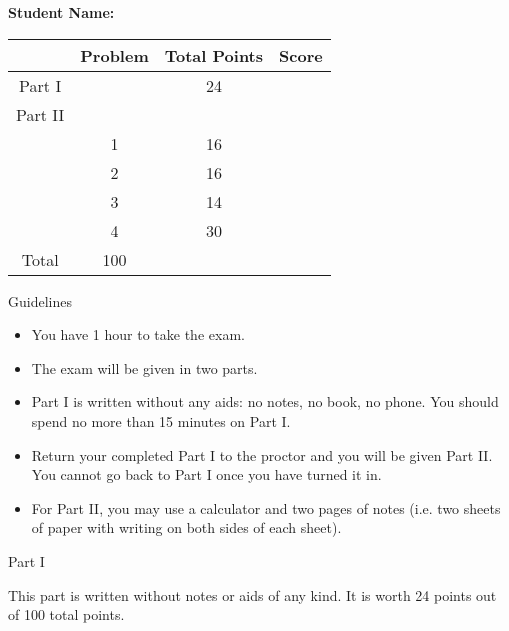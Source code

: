 \documentclass[11pt]{article}
\def\bc{\begin{center}}
\def\ec{\end{center}}
\begin{document}
\thispagestyle{fancy}

\vspace{1in}

\textbf{Student Name:}\hspace{2in}

\vspace{1in}

{
\renewcommand{\baselinestretch}{1.8}
\setlength{\tabcolsep}{.2in}
\normalsize
\begin{center}
\begin{tabular}{|c|c|c|c|}
\hline
&Problem&Total Points&\parbox{.8in}{\hfil Score\hfil}\\
\hline
Part I&&24&\\
\hline
Part II &&&\\
\hline
&1&16&\\
\hline
&2&16&\\
\hline
&3&14&\\
\hline
&4&30&\\
\hline
\hline
Total&100&&\\
\hline
\end{tabular}

\end{center}
}

\vspace{1in} 

Guidelines
\begin{itemize}
\item You have 1 hour to take the exam.
\item The exam will be given in two parts.
\item Part I is written without any aids: no notes, no book, no phone. You should spend no more than 15 minutes on Part I. 
\item Return your completed Part I to the proctor and you will be given Part II. You cannot go back to Part I once you have turned it in.
\item For Part II, you may use a calculator and two pages of notes (i.e. two sheets of paper with writing on both sides of each sheet).
\end{itemize}

\newpage


\vspace*{-0.3in}

\bc Part I \ec

This part is written without notes or aids of any kind. It is worth 24 points out of 100 total points. \\
\end{document}
